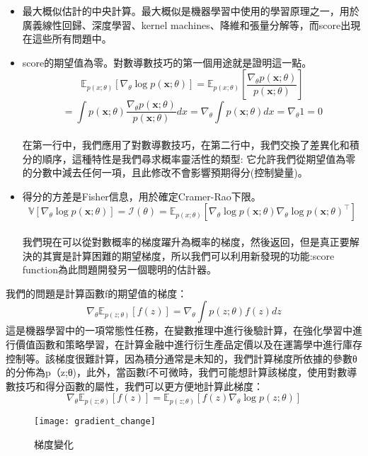 \begin{itemize}
\item 最大概似估計的中央計算。最大概似是機器學習中使用的學習原理之一，用於廣義線性回歸、深度學習、kernel machines、降維和張量分解等，而score出現在這些所有問題中。
\end{itemize}
\begin{itemize}
\item  score的期望值為零。對數導數技巧的第一個用途就是證明這一點。\\
$$\mathbb{E}_{p(x; \theta)}[\nabla_\theta \log p(\mathbf{x}; \theta)] =\mathbb{E}_{p(x; \theta)}\left[\frac{\nabla_\theta p(\mathbf {x}; \theta)}{p(\mathbf{x}; \theta)} \right]$$
$$= \int p(\mathbf {x}; \theta) \frac{\nabla_\theta p(\mathbf {x}; \theta)}{p(\mathbf{x}; \theta)} dx= \nabla_\theta \int p(\mathbf{x}; \theta) dx=\nabla_\theta 1 = 0$$\\
\qquad 在第一行中，我們應用了對數導數技巧，在第二行中，我們交換了差異化和積分的順序，這種特性是我們尋求概率靈活性的類型:  它允許我們從期望值為零的分數中減去任何一項，且此修改不會影響預期得分(控制變量)。
\end{itemize}
\begin{itemize}
\item 得分的方差是Fisher信息，用於確定Cramer-Rao下限。\\
$$\mathbb{V}[\nabla_\theta \log p(\mathbf{x}; \theta)] = \mathcal{I}(\theta) =\mathbb{E}_{p(x; \theta)}[\nabla_\theta \log p(\mathbf{x}; \theta)\nabla_\theta \log p(\mathbf{x}; \theta)^\top]$$\\
我們現在可以從對數概率的梯度躍升為概率的梯度，然後返回，但是真正要解決的其實是計算困難的期望梯度，所以我們可以利用新發現的功能:score function為此問題開發另一個聰明的估計器。
\end{itemize}
我們的問題是計算函數f的期望值的梯度：\\
$$\nabla_\theta \mathbb{E}_{p(z;\theta)}[f(z)] =\nabla_\theta \int p(z; \theta)f(z) dz$$
 這是機器學習中的一項常態性任務，在變數推理中進行後驗計算，在強化學習中進行價值函數和策略學習，在計算金融中進行衍生產品定價以及在運籌學中進行庫存控制等。該梯度很難計算，因為積分通常是未知的，我們計算梯度所依據的參數θ的分佈為p（z;θ)，此外，當函數f不可微時，我們可能想計算該梯度，使用對數導數技巧和得分函數的屬性，我們可以更方便地計算此梯度：\\
$$\nabla_\theta \mathbb{E}_{p(z;\theta)}[f(z)] = \mathbb{E}_{p(z;\theta)}[f(z)\nabla_\theta \log p(z;\theta)]$$
\begin{figure}[hbt!]
\begin{center}
\texttt{[image: gradient\_change]}
\caption{梯度變化}
\end{center}
\end{figure}
